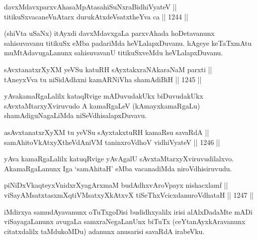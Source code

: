 
\begin{shl}
davxMdavxparxvAhasaMpAtasahiSuNxraBidhiVyateV || \\
titikuSxvacaneVnAtarx durukAtxdeVsatxtheYva ca \hfill || 1244 ||  
\end{shl}

\begin{artha}
(shiVta uSaNx) itAyxdi davxMdavxgaLa parxvAhada hoDetavanunx sahisuvavanu titikuSx eMba padariMda heVLalapxDuvanu. hAgeye keTaTxmAtu muMtAdavugaLanunx sahisuvavanU titikuSxveMdu heVLalapxDuvanu.
\end{artha}

\begin{shl}
sAvxtanatxrXyXM yeVSu katuRH sAyxtakxraNAkaraNaM parxti || \\
tAneyxVva tu niSidAdhxni kamARNiVha shamAdiBiH \hfill || 1245 ||  
\end{shl}

\begin{artha}
yAvakamaRgaLalilx kataqRvige mADuvudakUkx biDuvudakUkx sAvxtaMtarxyXviruvudo A kamaRgaLeV (kAmayxkamaRgaLu) shamAdiguNagaLiMda niSeVdhisalapxDuvavu.
\end{artha}

\begin{shl}
asAvxtanatxrXyXM tu yeVSu sAyxtakxtuRH kamaRsu savaRdA || \\
samAhitoVkAtxyX\s theVdAniVM taninxroVdhoV vidhiVyateV \hfill || 1246 || 
\end{shl}

\begin{artha}
yAva kamaRgaLalilx katuqRvige yAvAgalU sAvxtaMtarxyXviruvudilalxvo. AkamaRgaLanunx Iga `samAhitaH' eMba vacanadiMda niroVdhisiruvudu.
\end{artha}

\begin{shl}
piNiDxVkaqteyxVnidxrXyagArxmaM budAdhxvAroVpayx nishacxlamf || \\
viSayAMsatxtasxmXqtiVMsatxyXkAtxvX tiSeThxVcicxdanuroVdhataH \hfill || 1247 ||  
\end{shl}

\begin{artha}
iMdirxya samudAyavanunx oTuTxgoDisi budidhxyalilx irisi alAlxDadaMte mADi viSayagaLanunx avugaLa samxraNegaLanUnx biTuTx (ceYtanAyxkAravanunx citatxdalilx taMdukoMDu) adanunx anusarisi savaRdA irabeVku.
\end{artha}

